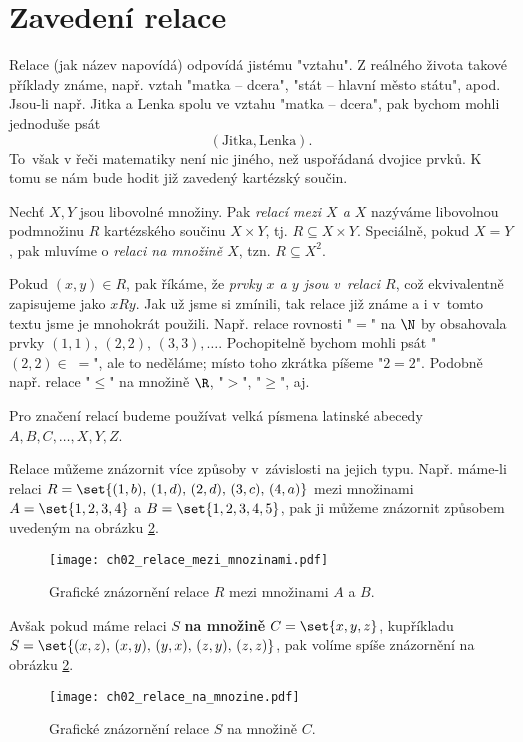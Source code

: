 \section{Zavedení relace}\label{sec:zavedeni_relace}
Relace (jak název napovídá) odpovídá jistému "vztahu". Z reálného života takové příklady známe, např. vztah "matka -- dcera", "stát -- hlavní město státu", apod. Jsou-li např. Jitka a Lenka spolu ve vztahu "matka -- dcera", pak bychom mohli jednoduše psát
\begin{equation*}
    (\text{Jitka}, \text{Lenka}).
\end{equation*}
To~však v řeči matematiky není nic jiného, než uspořádaná dvojice prvků. K tomu se nám bude hodit již zavedený kartézský součin.
\begin{definition}[Relace]\label{def:relace}
    Nechť $X,Y$ jsou libovolné množiny. Pak \emph{relací mezi $X$ a $X$} nazýváme libovolnou podmnožinu $R$ kartézského součinu $X\times Y$, tj. $R\subseteq X \times Y$. Speciálně, pokud $X=Y$, pak mluvíme o \emph{relaci na množině $X$}, tzn. $R\subseteq X^2$.
\end{definition}
Pokud $(x,y)\in R$, pak říkáme, že \emph{prvky $x$ a $y$ jsou v~relaci $R$}, což ekvivalentně zapisujeme jako $xRy$. Jak už jsme si zmínili, tak relace již známe a i v~tomto textu jsme je mnohokrát použili. Např. relace rovnosti "$=$" na $\N$ by obsahovala prvky $(1,1),\,(2,2),\,(3,3),\dots$. Pochopitelně bychom mohli psát "$(2,2)\in\;=$", ale to neděláme; místo toho zkrátka píšeme "$2=2$". Podobně např. relace "$\leq$" na množině $\R$, "$>$", "$\geq$", aj.
\begin{convention}
    Pro značení relací budeme používat velká písmena latinské abecedy $A,B,C,\dots,X,Y,Z$.
\end{convention}
Relace můžeme znázornit více způsoby v~závislosti na jejich typu. Např. máme-li relaci $R=\set{(1,b),\,(1,d),\,(2,d),\,(3,c),\,(4,a)}$ mezi množinami $A=\set{1,2,3,4}$ a $B=\set{1,2,3,4,5}$, pak ji můžeme znázornit způsobem uvedeným na obrázku \ref{fig:relace_mezi_mnozinami}.
\begin{figure}[H]
    \centering
    \texttt{[image: ch02\_relace\_mezi\_mnozinami.pdf]}
    \caption{Grafické znázornění relace $R$ mezi množinami $A$ a $B$.}
    \label{fig:relace_mezi_mnozinami}
\end{figure}
Avšak pokud máme relaci $S$ \textbf{na množině} $C=\set{x,y,z}$, kupříkladu $S=\set{(x,z),\,(x,y),\,(y,x),\,(z,y),\,(z,z)}$, pak volíme spíše znázornění na obrázku \ref{fig:relace_mezi_mnozinami}.
\begin{figure}[H]
    \centering
    \texttt{[image: ch02\_relace\_na\_mnozine.pdf]}
    \caption{Grafické znázornění relace $S$ na množině $C$.}
    \label{fig:relace_mezi_mnozinami}
\end{figure}
